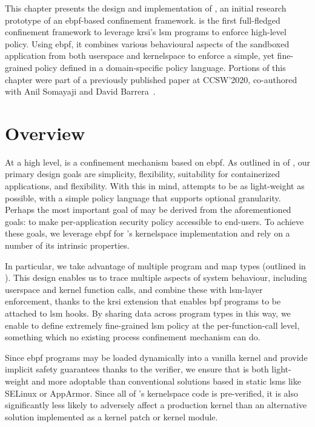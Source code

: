 This chapter presents the design and implementation of \bpfbox{}, an initial research
prototype of an \gls{ebpf}-based confinement framework. \bpfbox{} is the first
full-fledged confinement framework to leverage \gls{krsi}'s \gls{lsm} programs to enforce
high-level policy. Using \gls{ebpf}, it combines various behavioural aspects of the
sandboxed application from both userspace and kernelspace to enforce a simple, yet
fine-grained policy defined in a domain-specific policy language. Portions of this chapter
were part of a previously published paper at CCSW'2020, co-authored with Anil Somayaji and
David Barrera~\cite{findlay2020_bpfbox}.



\section{\bpfbox{} Overview}

At a high level, \bpfbox{} is a confinement mechanism based on \gls{ebpf}. As outlined in
 of , our primary design goals are
simplicity, flexibility, suitability for containerized applications, and flexibility. With
this in mind, \bpfbox{} attempts to be as light-weight as possible, with a simple policy
language that supports optional granularity. Perhaps the most important goal of \bpfbox{}
may be derived from the aforementioned goals: to make per-application security policy
accessible to end-users. To achieve these goals, we leverage \gls{ebpf} for \bpfbox{}'s
kernelspace implementation and rely on a number of its intrinsic properties.

In particular, we take advantage of multiple program and map types (outlined in
). This design enables us to trace multiple aspects of system
behaviour, including userspace and kernel function calls, and combine these with
\gls{lsm}-layer enforcement, thanks to the \gls{krsi} extension that enables \gls{bpf}
programs to be attached to \gls{lsm} hooks. By sharing data across program types in this
way, we enable \bpfbox{} to define extremely fine-grained \gls{lsm} policy at the
per-function-call level, something which no existing process confinement mechanism can do.

Since \gls{ebpf} programs may be loaded dynamically into a vanilla kernel and provide
implicit safety guarantees thanks to the verifier, we ensure that \bpfbox{} is both
light-weight and more adoptable than conventional solutions based in static \glspl{lsm}
like SELinux or AppArmor. Since all of \bpfbox{}'s kernelspace code is pre-verified, it is
also significantly less likely to adversely affect a production kernel than an alternative
solution implemented as a kernel patch or kernel module.

